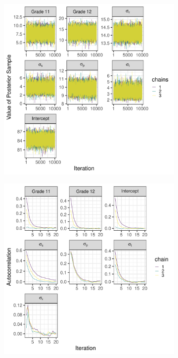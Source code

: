 \documentclass[a4paper]{article}
\begin{document}
\begin{figure}[!ht]
	\centering
	\begin{subfigure}{.5\textwidth}
		\centering
		\includegraphics[width=\linewidth]{figures/baselineTraceplots.pdf}
	\end{subfigure}%
	\begin{subfigure}{.5\textwidth}
		\centering
		\includegraphics[width=\linewidth]{figures/baselineAutocorrelationplots.pdf}

\end{subfigure}
\end{figure}
\end{document}
